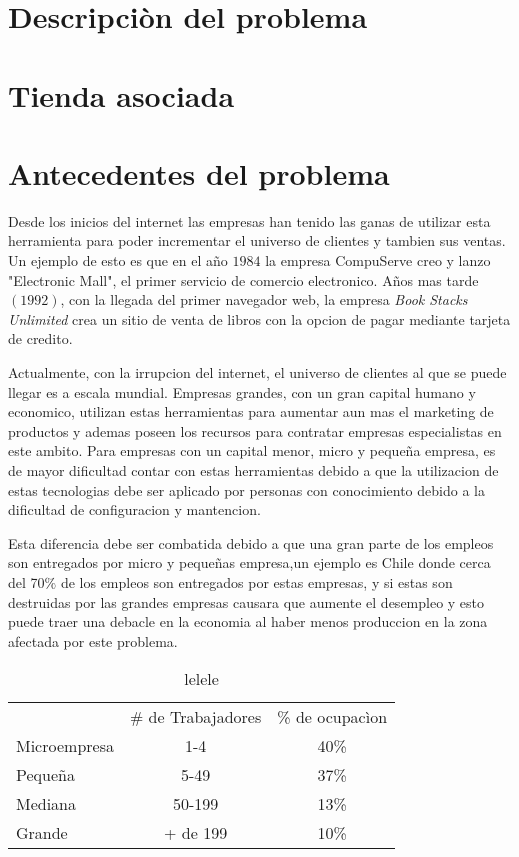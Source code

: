 \section{Descripciòn del problema}


\section{Tienda asociada}


\section{Antecedentes del problema}

Desde los inicios del internet las empresas han tenido las ganas de utilizar esta herramienta para poder
incrementar el universo de clientes y tambien sus ventas. Un ejemplo de esto es que en el año $1984$
la empresa CompuServe creo y lanzo "Electronic Mall", el primer servicio de comercio electronico\cite{Def:1}.
Años mas tarde$(1992)$, con la llegada del primer navegador web, la empresa \emph{Book Stacks Unlimited}
 crea un sitio de venta de libros con la opcion de pagar mediante tarjeta de credito.

Actualmente, con la irrupcion del internet, el universo de clientes al que se puede llegar es a escala
mundial. Empresas grandes, con un gran capital humano y economico, utilizan estas herramientas para aumentar
aun mas el marketing de productos y ademas poseen los recursos para contratar empresas especialistas en este
ambito. Para empresas con un capital menor, micro y pequeña empresa, es de mayor dificultad contar con estas 
herramientas debido a que la utilizacion de estas tecnologias debe ser aplicado por personas con conocimiento
debido a la dificultad de configuracion y mantencion.

Esta diferencia debe ser combatida debido a que una gran parte de los empleos son entregados por micro y pequeñas
 empresa,un ejemplo es Chile donde cerca del 70$\%$ de los empleos son entregados por estas empresas, y si 
estas son destruidas por las grandes empresas causara que aumente el desempleo y esto puede traer una debacle 
en la economia al haber menos produccion en la zona afectada por este problema.

\begin{table}[h]
\centering
\begin{tabular}{lcc}
             & \multicolumn{1}{l}{\# de Trabajadores} & \multicolumn{1}{l}{\% de ocupacìon} \\
Microempresa & 1-4                                    & 40\%                                \\
Pequeña      & 5-49                                   & 37\%                                \\
Mediana      & 50-199                                 & 13\%                                \\
Grande       & + de 199                               & 10\%
\end{tabular}
\caption[lala]{lelele}
\end{table}

